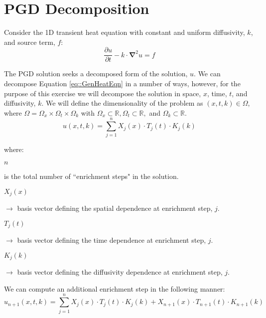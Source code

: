 \documentclass{article}
\def\ds{\displaystyle}
\def\pd{\partial}
\def\grad{\mathbf\nabla}
\begin{document}
\section{PGD Decomposition}
Consider the 1D transient heat equation with constant and uniform diffusivity, $k$, and source term, $f$:
\begin{equation}
\label{eq::GenHeatEqn}
\frac{\pd u}{\pd t} -k\cdot \grad^2 u = f
\end{equation}

The PGD solution seeks a decomposed form of the solution, $u$. We can decompose Equation \ref{eq::GenHeatEqn} in a number of ways, however, for the purpose of this exercise we will decompose the solution in space, $x$, time, $t$, and diffusivity, $k$. We will define the dimensionality of the problem as $\left( x,t,k \right) \in \Omega$, where $\Omega = \Omega_x \times \Omega_t \times \Omega_k$ with $\Omega_x \subset \mathbb{R}, \Omega_t \subset \mathbb{R},$ and $\Omega_k \subset \mathbb{R}$.
\begin{equation}
u(x,t,k) = \ds\sum_{j=1}^n X_j(x) \cdot T_j(t) \cdot K_j(k)
\end{equation}

\vspace{-6pt}where:\\[-3pt]

\hspace*{15pt}\begin{minipage}{4.5in}

$n$
\parbox[t][0.65cm]{4.5in}{ is the total number of ``enrichment steps" in the solution.}

$X_j(x)$
\parbox[t][0.65cm]{4.5in}{ $\to$ basis vector defining the spatial dependence at enrichment step, $j$.}

$T_j(t)$
\parbox[t][0.65cm]{4.5in}{ $\to$ basis vector defining the time dependence at enrichment step, $j$.}

$K_j(k)$
\parbox[t][0.65cm]{4.5in}{ $\to$ basis vector defining the diffusivity dependence at enrichment step, $j$.}

\end{minipage}\vspace{5pt}

We can compute an additional enrichment step in the following manner:
\begin{equation}
\label{eq::TrialFctn}
u_{n+1}(x,t,k) = \ds\sum_{j=1}^n X_j(x) \cdot T_j(t) \cdot K_j(k) + X_{n+1}(x) \cdot T_{n+1}(t) \cdot K_{n+1}(k)
\end{equation}
\end{document}
